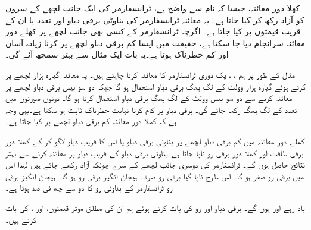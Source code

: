 کھلا  دور معائنہ، جیسا کہ نام سے واضح  ہے،  ٹرانسفارمر کی ایک جانب لچھے کے سروں کو آزاد رکھ کر کیا جاتا ہے۔ یہ معائنہ ٹرانسفارمر کی بناوٹی برقی دباو اور تعدد یا ان کے قریب قیمتوں پر کیا جاتا ہے۔ اگرچہ ٹرانسفارمر کے کسی بھی جانب  لچھے پر کھلے دور معائنہ  سرانجام دیا جا سکتا ہے، حقیقت میں ایسا کم برقی دباو لچھے پر کرنا زیادہ آسان اور کم خطرناک  ہوتا ہے۔یہ بات ایک مثال سے بہتر  سمجھ آئے گی۔

مثال کے طور پر  ہم  ، ،  یک دوری  ٹرانسفارمر کا معائنہ کرنا چاہتے ہیں۔ یہ معائنہ گیارہ ہزار لچھے پر  کرتے ہوئے  گیارہ ہزار وولٹ  کے لگ بھگ برقی دباو استعمال ہو گا جبکہ دو سو بیس برقی دباو  لچھے پر معائنہ کرنے سے دو سو بیس وولٹ کے لگ بھگ برقی دباو  استعمال کرنا ہو  گا۔ دونوں صورتوں میں تعدد  کے لگ بھگ رکھا جائے گی۔ برقی دباو پر کام کرنا نہایت خطرناک ثابت ہو سکتا ہے۔یہی وجہ ہے کہ کھلا دور  معائنہ کم برقی دباو لچھے پر کیا جاتا ہے۔

کھلے دور  معائنہ میں کم برقی دباو لچھے پر بناوٹی برقی دباو یا اس کا قریب  دباو  لاگو کر کے کھلا دور برقی طاقت  اور  کھلا دور برقی رو   ناپا جاتا ہے۔بناوٹی  برقی دباو کے  قریب  دباو پر معائنہ کرنے سے  بہتر نتائج حاصل ہوں گے۔ ٹرانسفارمر کی دوسری جانب لچھے کے سرے چونکہ آزاد رکھے جاتے ہیں لہٰذا اس میں  برقی رو صفر ہو گا۔  اس طرح  ناپا گیا برقی رو صرف ہیجان انگیز برقی رو  ہو گا۔  ہیجان انگیز برقی رو ٹرانسفارمر کے بناوٹی رو کا  دو سے چھ  فی صد ہوتا ہے۔

یاد رہے  اور  ہوں گے۔ برقی دباو اور رو کی بات کرتے ہوئے ہم ان کی مطلق موثر قیمتوں،  اور ، کی بات کرتے ہیں۔ 

